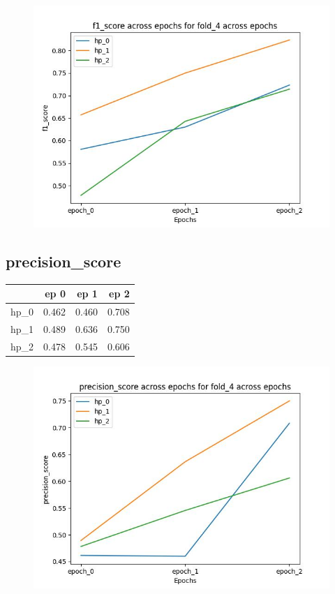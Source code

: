 \documentclass{article}
\begin{document}
\begin{figure}[H]
\includegraphics[scale = 0.75]{fold_4/f1_score}
\end{figure}
\subsection{precision\_score}
\begin{tabular}{lrrr}
\toprule
{} &   ep 0 &   ep 1 &   ep 2 \\
\midrule
hp\_0 &  0.462 &  0.460 &  0.708 \\
hp\_1 &  0.489 &  0.636 &  0.750 \\
hp\_2 &  0.478 &  0.545 &  0.606 \\
\bottomrule
\end{tabular}

\begin{figure}[H]
\includegraphics[scale = 0.75]{fold_4/precision_score}
\end{figure}
\end{document}

